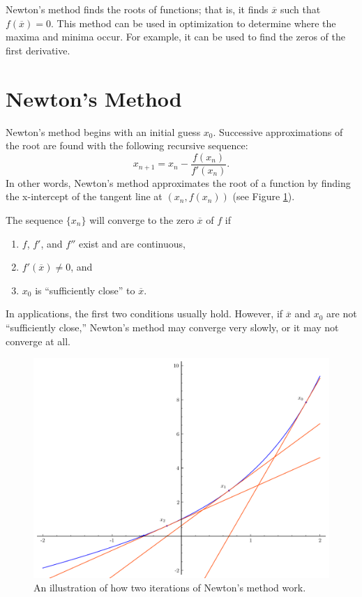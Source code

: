 \label{lab:NewtonsMethod}

Newton's method finds the roots of functions; that is, it finds $\overline{x}$ such that $f\left(\overline{x}\right) = 0$.
This method can be used in optimization to determine where the maxima and minima occur. For example, it can be used to find the zeros of the first derivative.

\section*{Newton's Method} %

Newton's method begins with an initial guess $x_0$.
Successive approximations of the root are found with the following recursive sequence:
\[
x_{n+1} = x_n - \frac{f(x_n)}{f'(x_n)}.
\]
In other words, Newton's method approximates the root of a function by finding the x-intercept of the tangent line at $(x_n, f(x_n))$ (see Figure \ref{fig:newton}).

The sequence $\{x_n\}$ will converge to the zero $\overline{x}$ of $f$ if
\begin{enumerate}
\item $f$, $f'$, and $f''$ exist and are continuous,
\item $f'(\overline{x})\neq0$, and
\item $x_0$ is ``sufficiently close'' to $\overline{x}$.
\end{enumerate}
In applications, the first two conditions usually hold.
However, if $\overline{x}$ and $x_0$ are not ``sufficiently close,'' Newton's method may converge very slowly, or it may not converge at all.

\begin{figure}[h]
\label{fig:newton}
\centering
\includegraphics[width=\textwidth]{figures/newton_iters.pdf}
\caption{An illustration of how two iterations of Newton's method work.}
\end{figure}

